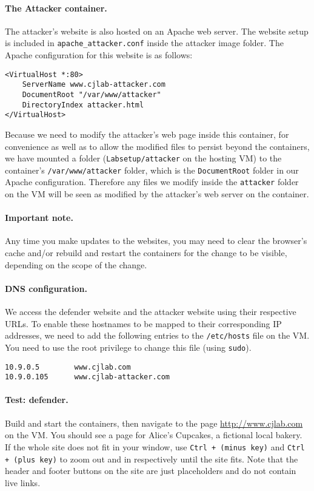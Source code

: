 \paragraph{The Attacker container.}
The attacker's website is also hosted on an Apache web server.  The
website setup is included in \texttt{apache\_attacker.conf} inside the
attacker image folder.  The Apache configuration for this website is
as follows:

\begin{lstlisting}
<VirtualHost *:80>
    ServerName www.cjlab-attacker.com
    DocumentRoot "/var/www/attacker"
    DirectoryIndex attacker.html
</VirtualHost>
\end{lstlisting}
 
Because we need to modify the attacker's web page inside this container,
for convenience as well as to allow the modified files to persist beyond
the containers, we have mounted a folder (\texttt{Labsetup/attacker} on
the hosting VM) to the container's \texttt{/var/www/attacker} folder,
which is the \texttt{DocumentRoot} folder in our Apache configuration.
Therefore any files we modify inside the \texttt{attacker} folder on the
VM will be seen as modified by the attacker's web server on the
container. 

\paragraph{Important note.} Any time you make updates to the websites,
you may need to clear the browser's cache and/or rebuild and restart the
containers for the change to be visible, depending on the scope of the
change.

\paragraph{DNS configuration.}
We access the defender website and the attacker website using their
respective URLs.  To enable these hostnames to be mapped to their
corresponding IP addresses, we need to add the following entries to the
\texttt{/etc/hosts} file on the VM.  You need to use the root privilege
to change this file (using \texttt{sudo}).

\begin{lstlisting}
10.9.0.5        www.cjlab.com
10.9.0.105      www.cjlab-attacker.com
\end{lstlisting}


\paragraph{Test: defender.} Build and start the containers, then
navigate to the page \url{http://www.cjlab.com} on the VM.  You should
see a page for Alice's Cupcakes, a fictional local bakery. If the whole
site does not fit in your window, use \texttt{Ctrl + (minus key)} and
\texttt{Ctrl + (plus key)} to zoom out and in respectively until the
site fits.  Note that the header and footer buttons on the site are just
placeholders and do not contain live links.

